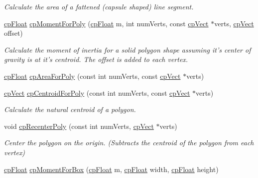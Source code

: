 \begin{DoxyCompactItemize}
\begin{DoxyCompactList}\small\item\em Calculate the area of a fattened (capsule shaped) line segment. \end{DoxyCompactList}\item 
\hypertarget{group__misc_gad798ba85a48f34712d1bf3352c601311}{\hyperlink{group__basic_types_gac1ed65573e035bf892505768c852d8d3}{cp\-Float} \hyperlink{group__misc_gad798ba85a48f34712d1bf3352c601311}{cp\-Moment\-For\-Poly} (\hyperlink{group__basic_types_gac1ed65573e035bf892505768c852d8d3}{cp\-Float} m, int num\-Verts, const \hyperlink{structcp_vect}{cp\-Vect} $\ast$verts, \hyperlink{structcp_vect}{cp\-Vect} offset)}\label{group__misc_gad798ba85a48f34712d1bf3352c601311}

\begin{DoxyCompactList}\small\item\em Calculate the moment of inertia for a solid polygon shape assuming it's center of gravity is at it's centroid. The offset is added to each vertex. \end{DoxyCompactList}\item 
\hyperlink{group__basic_types_gac1ed65573e035bf892505768c852d8d3}{cp\-Float} \hyperlink{group__misc_gae36b38bbc25253a9f5d1ad7b3ed7f375}{cp\-Area\-For\-Poly} (const int num\-Verts, const \hyperlink{structcp_vect}{cp\-Vect} $\ast$verts)
\item 
\hypertarget{group__misc_ga1237b920f83b89dcdae62ef6e60954cd}{\hyperlink{structcp_vect}{cp\-Vect} \hyperlink{group__misc_ga1237b920f83b89dcdae62ef6e60954cd}{cp\-Centroid\-For\-Poly} (const int num\-Verts, const \hyperlink{structcp_vect}{cp\-Vect} $\ast$verts)}\label{group__misc_ga1237b920f83b89dcdae62ef6e60954cd}

\begin{DoxyCompactList}\small\item\em Calculate the natural centroid of a polygon. \end{DoxyCompactList}\item 
\hypertarget{group__misc_ga22491470b89fcb3fcc0f735be2d5ab26}{void \hyperlink{group__misc_ga22491470b89fcb3fcc0f735be2d5ab26}{cp\-Recenter\-Poly} (const int num\-Verts, \hyperlink{structcp_vect}{cp\-Vect} $\ast$verts)}\label{group__misc_ga22491470b89fcb3fcc0f735be2d5ab26}

\begin{DoxyCompactList}\small\item\em Center the polygon on the origin. (Subtracts the centroid of the polygon from each vertex) \end{DoxyCompactList}\item 
\hypertarget{group__misc_gaf7b38a68ad64e02f7542eaab640e6743}{\hyperlink{group__basic_types_gac1ed65573e035bf892505768c852d8d3}{cp\-Float} \hyperlink{group__misc_gaf7b38a68ad64e02f7542eaab640e6743}{cp\-Moment\-For\-Box} (\hyperlink{group__basic_types_gac1ed65573e035bf892505768c852d8d3}{cp\-Float} m, \hyperlink{group__basic_types_gac1ed65573e035bf892505768c852d8d3}{cp\-Float} width, \hyperlink{group__basic_types_gac1ed65573e035bf892505768c852d8d3}{cp\-Float} height)}\label{group__misc_gaf7b38a68ad64e02f7542eaab640e6743}


\end{DoxyCompactItemize}

